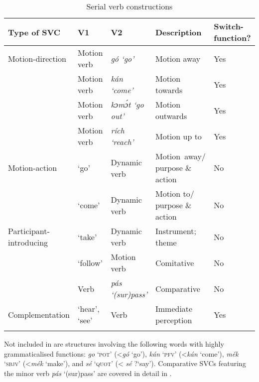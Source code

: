 \begin{table}
\caption{Serial verb constructions}
\label{tab:key:11.1}
\small
\begin{tabularx}{\textwidth}{lp{1.8cm}lQl}
\lsptoprule

Type of SVC & V1 & V2 & Description & Switch-function?\\
\midrule
Motion-direction & Motion verb & \itshape gó \textup{‘go’} & Motion away & Yes\\
& Motion verb & \itshape kán \textup{‘come’} & Motion towards & Yes\\
& Motion verb & \itshape kɔmɔ́t \textup{‘go out’} & Motion outwards & Yes\\
& Motion verb & \itshape rích \textup{‘reach’} & Motion up to & Yes\\

\tablevspace
Motion-action &  ‘go’ & Dynamic verb & Motion~away/ purpose \& action & No\\
&  ‘come’ & Dynamic verb & Motion to/ purpose \& action & No\\

\tablevspace
Participant-introducing  &  ‘take’ & Dynamic verb & Instrument; theme\index{} & No\\
&  ‘follow’ & Motion verb & Comitative  & No\\
& Verb & \itshape pás \textup{‘(sur)pass’} & Comparative & No\\


\tablevspace
Complementation &  ‘hear’,\newline  {} ‘see’ & Verb & Immediate perception & Yes\\
\lspbottomrule
\end{tabularx}
\end{table}


Not included in  are structures involving the following words with highly grammaticalised functions: \textit{go} \textsc{‘pot’} (<\textit{gó} ‘go’), \textit{kán} \textsc{‘pfv’} (<\textit{kán} ‘come’), \textit{mék} \textsc{‘sbjv’} (<\textit{mék} ‘make’), and \textit{sé} \textsc{‘quot’} (< \textit{sé} ?‘say’). Comparative SVCs featuring the minor verb \textit{pás} ‘(sur)pass’ are covered in detail in .


